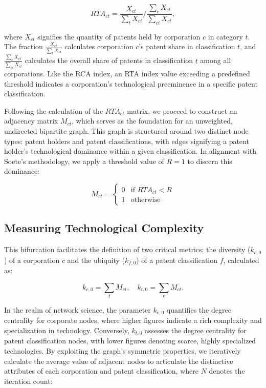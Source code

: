\documentclass[fleqn,10pt]{wlscirep}
\begin{document}
\[
RTA_{ct} = \frac{X_{ct}}{\sum_{t} X_{ct}} / \frac{\sum_{c} X_{ct}}{\sum_{ct} X_{ct}},
\]

where \(X_{ct}\) signifies the quantity of patents held by corporation \(c\) in category \(t\). The fraction \(\frac{X_{ct}}{\sum_{t} X_{ct}}\) calculates corporation \(c\)'s patent share in classification \(t\), and \(\frac{\sum_{c} X_{ct}}{\sum_{ct} X_{ct}}\) calculates the overall share of patents in classification \(t\) among all corporations. 
Like the RCA index, an RTA index value exceeding a predefined threshold indicates a corporation's technological preeminence in a specific patent classification.

Following the calculation of the \(RTA_{ct}\) matrix, we proceed to construct an adjacency matrix \(M_{ct}\), which serves as the foundation for an unweighted, undirected bipartite graph. This graph is structured around two distinct node types: patent holders and patent classifications, with edges signifying a patent holder's technological dominance within a given classification. In alignment with Soete's methodology, we apply a threshold value of \(R=1\) to discern this dominance:

\[
M_{ct} = 
\begin{cases} 
0 & \text{if } RTA_{ct} < R \\
1 & \text{otherwise}
\end{cases}
\]
\subsection*{Measuring Technological Complexity}

This bifurcation facilitates the definition of two critical metrics: the diversity (\(k_{c,0}\)) of a corporation \(c\) and the ubiquity (\(k_{f,0}\)) of a patent classification \(f\), calculated as:

\[
k_{c,0} = \sum_{t}{M_{ct}},\quad k_{t,0} = \sum_{c}{M_{ct}}.
\]

In the realm of network science, the parameter \(k_{c,0}\) quantifies the degree centrality for corporate nodes, where higher figures indicate a rich complexity and specialization in technology. Conversely, \(k_{t,0}\) assesses the degree centrality for patent classification nodes, with lower figures denoting scarce, highly specialized technologies. 
By exploiting the graph's symmetric properties, we iteratively calculate the average value of adjacent nodes to articulate the distinctive attributes of each corporation and patent classification, where \(N\) denotes the iteration count:
\end{document}

